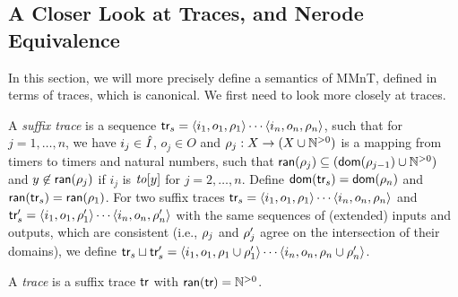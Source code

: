 \subsection{A Closer Look at Traces, and Nerode Equivalence}  
In this section, we will more precisely define a semantics of MMnT,
defined in terms of traces, which is canonical. We first need to look more
closely at traces.

A {\em suffix trace}
is a sequence
$\textsf{tr}_s = \langle i_1,o_1,\rho_1\rangle\cdots\langle i_n,o_n,\rho_n\rangle$,
such that for $j = 1, \ldots , n$, we have $i_j \in \hat{I}$, $o_j \in O$ and
$\rho_j: X \rightarrow (X \cup {\mathbb N}^{>0})$ is a mapping from timers to
timers and natural numbers, such that 
${\textsf{ran}}(\rho_j) \subseteq ({\textsf{dom}}(\rho_{j-1}) \cup {\mathbb N}^{>0})$ and
$y \not\in {\textsf{ran}}(\rho_j)$ if $i_j$ is $\mathit{to}[y]$ for
$j = 2, \ldots, n$. Define
${\textsf{dom}}(\textsf{tr}_s) = {\textsf{dom}}(\rho_n)$ and
  ${\textsf{ran}}(\textsf{tr}_s) = {\textsf{ran}}(\rho_1)$.
For two suffix traces 
$\textsf{tr}_s = \langle i_1,o_1,\rho_1\rangle\cdots\langle i_n,o_n,\rho_n\rangle$ and
$\textsf{tr}_s' = \langle i_1,o_1,\rho_1'\rangle\cdots\langle i_n,o_n,\rho_n'\rangle$
with the same sequences of (extended) inputs and outputs, which
are consistent (i.e., $\rho_j$ and $\rho_j'$ agree on the intersection of their domains), we define 
$\textsf{tr}_s \sqcup \textsf{tr}_s' = \langle i_1,o_1,\rho_1 \cup \rho_1'\rangle\cdots\langle i_n,o_n,\rho_n\cup\rho_n'\rangle$.

A {\em trace} is a suffix trace $\textsf{tr}$ with ${\textsf{ran}}(\textsf{tr}) = {\mathbb N}^{>0}$.

